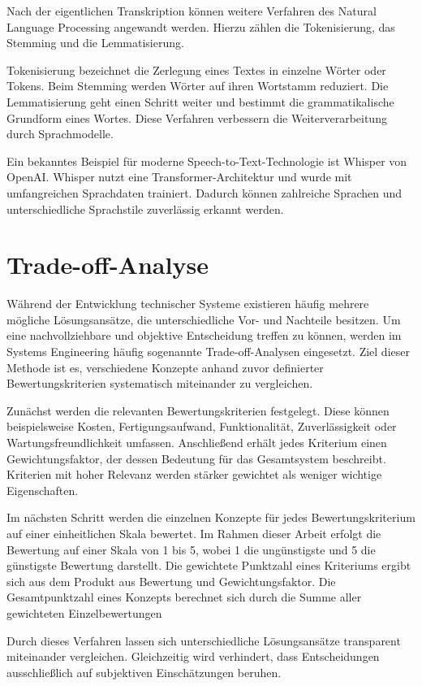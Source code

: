 \newpage
Nach der eigentlichen Transkription können weitere Verfahren des Natural Language Processing angewandt werden. Hierzu zählen die Tokenisierung, das Stemming und die Lemmatisierung. \cite{jurafsky2026speech}

Tokenisierung bezeichnet die Zerlegung eines Textes in einzelne Wörter oder Tokens. Beim Stemming werden Wörter auf ihren Wortstamm reduziert. Die Lemmatisierung geht einen Schritt weiter und bestimmt die grammatikalische Grundform eines Wortes. Diese Verfahren verbessern die Weiterverarbeitung durch Sprachmodelle. 

Ein bekanntes Beispiel für moderne Speech-to-Text-Technologie ist Whisper von OpenAI. Whisper nutzt eine Transformer-Architektur und wurde mit umfangreichen Sprachdaten trainiert. Dadurch können zahlreiche Sprachen und unterschiedliche Sprachstile zuverlässig erkannt werden. \cite{radford2022whisper}

\section{Trade-off-Analyse}

Während der Entwicklung technischer Systeme existieren häufig mehrere mögliche Lösungsansätze, die unterschiedliche Vor- und Nachteile besitzen. Um eine nachvollziehbare und objektive Entscheidung treffen zu können, werden im Systems Engineering häufig sogenannte Trade-off-Analysen eingesetzt. Ziel dieser Methode ist es, verschiedene Konzepte anhand zuvor definierter Bewertungskriterien systematisch miteinander zu vergleichen.

Zunächst werden die relevanten Bewertungskriterien festgelegt. Diese können beispielsweise Kosten, Fertigungsaufwand, Funktionalität, Zuverlässigkeit oder Wartungsfreundlichkeit umfassen. Anschließend erhält jedes Kriterium einen Gewichtungsfaktor, der dessen Bedeutung für das Gesamtsystem beschreibt. Kriterien mit hoher Relevanz werden stärker gewichtet als weniger wichtige Eigenschaften.

Im nächsten Schritt werden die einzelnen Konzepte für jedes Bewertungskriterium auf einer einheitlichen Skala bewertet. Im Rahmen dieser Arbeit erfolgt die Bewertung auf einer Skala von 1 bis 5, wobei 1 die ungünstigste und 5 die günstigste Bewertung darstellt. Die gewichtete Punktzahl eines Kriteriums ergibt sich aus dem Produkt aus Bewertung und Gewichtungsfaktor.
Die Gesamtpunktzahl eines Konzepts berechnet sich durch die Summe aller gewichteten Einzelbewertungen


Durch dieses Verfahren lassen sich unterschiedliche Lösungsansätze transparent miteinander vergleichen. Gleichzeitig wird verhindert, dass Entscheidungen ausschließlich auf subjektiven Einschätzungen beruhen. 
